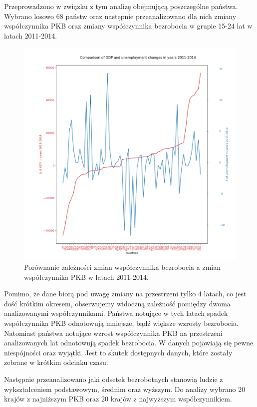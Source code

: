 \documentclass{article}
\begin{document}
\clearpage
Przeprowadzono w związku z tym analizę obejmującą poszczególne państwa. Wybrano losowo 68 państw oraz następnie przeanalizowano dla nich zmiany współczynnika PKB oraz zmiany współczynnika bezrobocia w grupie 15-24 lat w latach 2011-2014.

\begin{figure}[h!]
\begin{center}
\includegraphics[width=5 in]{Pictures/8_gdp_vs_unemployment.png}
\end{center}
\captionsetup{justification=centering}
\caption{Porównanie zależności zmian współczynnika bezrobocia a zmian współczynnika PKB w latach 2011-2014.}
\label{fig:8_unemployment_vs_gdp}
\end{figure}

Pomimo, że dane biorą pod uwagę zmiany na przestrzeni tylko 4 latach, co jest dość krótkim okresem, obserwujemy widoczną zależność pomiędzy dwoma analizowanymi współczynnikami. Państwa notujące w tych latach spadek współczynnika PKB odnotowują mniejsze, bądź większe wzrosty bezrobocia. Natomiast państwa notujące wzrost współczynnika PKB na przestrzeni analizowanych lat odnotowują spadek bezrobocia. W danych pojawiają się pewne niespójności oraz wyjątki. Jest to skutek dostępnych danych, które zostały zebrane w krótkim odcinku czasu.

Następnie przeanalizowano jaki odsetek bezrobotnych stanowią ludzie z wykształceniem podstawowym, średnim oraz wyższym. 
Do analizy wybrano 20 krajów z najniższym PKB oraz 20 krajów z najwyższym współczynnikiem.
\end{document}
